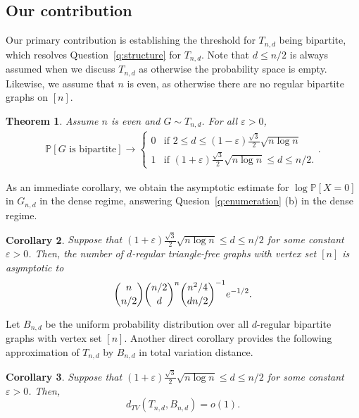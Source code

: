 \documentclass[11pt]{article}
\newcommand{\eps}{\varepsilon}
\def\P{\mathbb P}
\theoremstyle{plain}
\newtheorem{thm}{Theorem}[section]
\newtheorem{cor}[thm]{Corollary}
\begin{document}
 \subsection{Our contribution}
Our primary contribution is establishing the threshold for $T_{n,d}$ being bipartite, which resolves Question~\ref{q:structure} for $T_{n,d}$. Note that $d\le n/2$ is always assumed when we discuss $T_{n,d}$ as otherwise the probability space is empty. Likewise, we assume that $n$ is even, as otherwise there are no regular bipartite graphs on $[n]$. 


\begin{thm}\label{thm: 0-1}
Assume $n$ is even and $G \sim T_{n,d}$. For all $\varepsilon > 0$,
    \begin{align*}
        \mathbb{P}[G \text{ is bipartite}] \rightarrow \begin{cases}
            0 &\text{if } 2 \leq d \leq (1 - \varepsilon)\frac{\sqrt 3}{2}\sqrt{n\log n}\\
            1 &\text{if }  (1 + \varepsilon)\frac{\sqrt 3}{2}\sqrt{n \log n} \le d \le n/2.
        \end{cases}
        .
    \end{align*}
\end{thm}


As an immediate corollary, we obtain the asymptotic estimate for $\log \P[X=0]$ in $G_{n,d}$ in the dense regime, answering Quesion~\ref{q:enumeration} (b) in the dense regime.


\begin{cor}\label{cor: enum}
    Suppose that $ (1 + \eps)\frac{\sqrt3}{2}\sqrt{n\log n} \le d\le n/2$ for some constant $\eps > 0$. Then, the number of $d$-regular triangle-free graphs with vertex set $[n]$ is asymptotic to
    \begin{equation}\notag
        \binom{n}{n/2}\binom{n/2}{d}^n\binom{n^2/4}{dn/2}^{-1}e^{-1/2}.
    \end{equation}
    
\end{cor}

Let $B_{n,d}$ be the uniform probability distribution over all $d$-regular bipartite graphs with vertex set $[n]$. Another direct corollary provides the following approximation of $T_{n,d}$ by $B_{n,d}$ in total variation distance.

\begin{cor} Suppose that $(1 + \eps)\frac{\sqrt3}{2}\sqrt{n\log n}\le d\le n/2$ for some constant $\eps > 0$. Then, $$d_{TV}(T_{n,d},B_{n,d})=o(1).$$
   

\end{cor}
\end{document}
